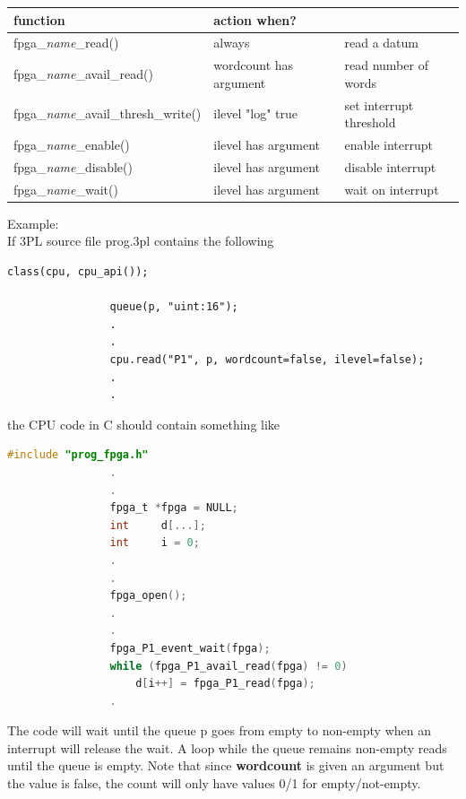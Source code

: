             \begin{tabular}{| l | l | l |}
            \hline
            function                                 & action when?           &                         \\ \hline \hline
            fpga\_{\em name}\_read()                 & always                 & read a datum            \\ \hline
            fpga\_{\em name}\_avail\_read()          & wordcount has argument & read number of words    \\ \hline
            fpga\_{\em name}\_avail\_thresh\_write() & ilevel "log" true      & set interrupt threshold \\ \hline
            fpga\_{\em name}\_enable()               & ilevel has argument    & enable interrupt        \\ \hline
            fpga\_{\em name}\_disable()              & ilevel has argument    & disable interrupt       \\ \hline 
            fpga\_{\em name}\_wait()                 & ilevel has argument    & wait on interrupt       \\ \hline  
            \end{tabular}
            
            Example: \\
            If 3PL source file prog.3pl contains the following \\
            \begin{lstlisting}[gobble=12, language=threepl]
                class(cpu, cpu_api());
                
                queue(p, "uint:16");
                .
                .
                cpu.read("P1", p, wordcount=false, ilevel=false);
                .
                .
            \end{lstlisting}
            the CPU code in C should contain something like \\
            \begin{lstlisting}[gobble=12, language=C]
                #include "prog_fpga.h"
                .
                .
                fpga_t *fpga = NULL;
                int     d[...];
                int     i = 0;
                .
                .
                fpga_open();
                .
                .
                fpga_P1_event_wait(fpga);
                while (fpga_P1_avail_read(fpga) != 0)
                    d[i++] = fpga_P1_read(fpga);
                .
            \end{lstlisting}
            The code will wait until the queue p goes from empty to non-empty
            when an interrupt will release the wait. A loop while the queue
            remains non-empty reads until the queue is empty. Note that since
            {\bf wordcount} is given an argument but the value is false, the count
            will only have values 0/1 for empty/not-empty.
           
